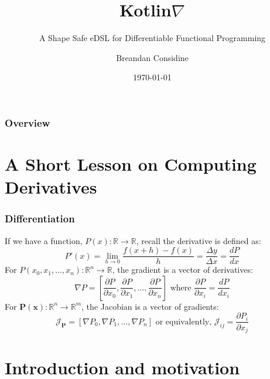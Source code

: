 \documentclass{beamer}
\title{Kotlin\texorpdfstring{$\nabla$}{}}
\subtitle{A Shape Safe eDSL for Differentiable Functional Programming}
\author{Breandan Considine}
\institute[McGill]{
McGill University \\
\medskip
\textit{breandan.considine@mcgill.ca}
}
\date{\today}
\begin{document}
    \begin{frame}
        \titlepage
    \end{frame}

    \begin{frame}
        \frametitle{Overview}
        \tableofcontents
    \end{frame}

    \section{A Short Lesson on Computing Derivatives}


    \begin{frame}
        \frametitle{Differentiation}
        If we have a function, $P(x): \mathbb{R}\rightarrow\mathbb{R}$, recall the derivative is defined as:
        \begin{equation}
            P'(x) = \lim _{h\to 0}{\frac {f(x+h)-f(x)}{h}} = \frac{\Delta y}{\Delta x} = \frac{dP}{dx}
        \end{equation}
        For $P(x_0, x_1, \dots, x_n): \mathbb{R}^n\rightarrow\mathbb{R}$, the gradient is a vector of derivatives:
        \begin{equation}
            \nabla P = \left[\frac{\partial P}{\partial x_0}, \frac{\partial P}{\partial x_1}, \dots, \dfrac{\partial P}{\partial x_n}\right]\text{ where }\frac{\partial P}{\partial x_i} = \frac{dP}{dx_i}
        \end{equation}
        For $\mathbf{P}(\mathbf{x}): \mathbb{R}^n\rightarrow\mathbb{R}^m$, the Jacobian is a vector of gradients:
        \begin{equation}
            \mathcal{J}_\mathbf{P} = \left[\nabla P_0, \nabla P_1, \dots, \nabla P_n \right] \text{ or equivalently, } \mathcal{J}_{ij} = \frac{\partial P_i}{\partial x_j}
        \end{equation}
    \end{frame}


    \section{Introduction and motivation}
\end{document}

